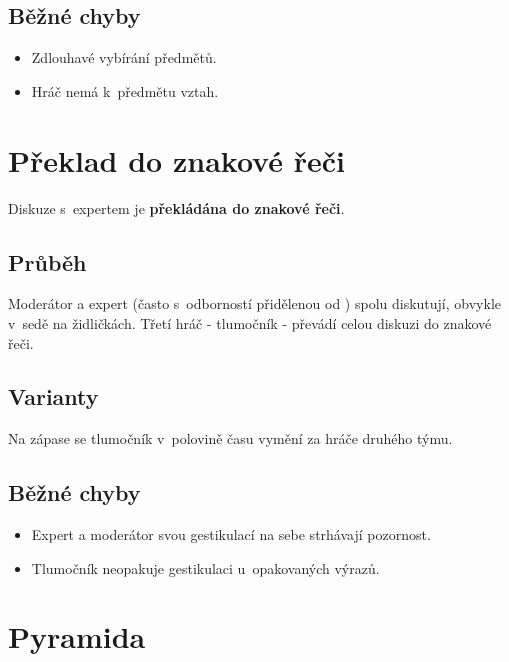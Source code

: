 \subsection{Běžné chyby} \begin{itemize}
\item Zdlouhavé vybírání předmětů.
\item Hráč nemá k~předmětu vztah.
\end{itemize}
 
 
 
 
 
 
\needspace{5cm} \section{Překlad do znakové řeči} \label{překlad do znakové řeči}  
 
Diskuze s~expertem je \textbf{překládána do znakové řeči}. 
 
\subsection{Průběh} Moderátor a expert (často s~odborností přidělenou od ) spolu diskutují, obvykle v~sedě na židličkách. Třetí hráč  - tlumočník  - převádí celou diskuzi do znakové řeči. 
 
\subsection{Varianty} Na zápase se tlumočník v~polovině času vymění za hráče druhého týmu. 
 
\subsection{ Běžné chyby } \begin{itemize}
\item  Expert a moderátor svou gestikulací na sebe strhávají pozornost.
\item  Tlumočník neopakuje gestikulaci u~opakovaných výrazů.
\end{itemize}
 
 
 
 
\needspace{5cm} \section{Pyramida} \label{pyramida}  
 

